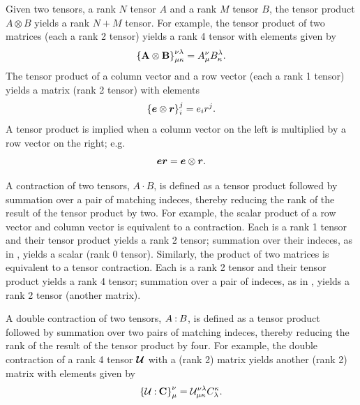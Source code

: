 Given two tensors, a rank $N$ tensor $A$ and a rank $M$ tensor $B$, the tensor product $A \otimes B$ yields a rank $N+M$ tensor.  
%
For example, the tensor product of two matrices (each a rank 2 tensor) yields a rank 4 tensor with elements given by
%
\begin{equation}
\label{eqn:matrix_tensor_product}
	\left\{ {\bf A} \otimes {\bf B} \right\}_{\mu\kappa}^{\nu\lambda} = A_\mu^\nu B_\kappa^\lambda.
\end{equation}
%
The tensor product of a column vector and a row vector (each a rank 1 tensor) yields a matrix (rank 2 tensor)
with elements 
\begin{equation}
	\left\{ \mbox{\boldmath $e$} \otimes \mbox{\boldmath $r$}\right\}_i^j = e_i r^j.
	\label{eqn:tensor_product}
\end{equation}
%
A tensor product is implied when a column vector on the left
is multiplied by a row vector on the right; e.g.
%
\begin{equation}
	\mbox{\boldmath $e$} \mbox{\boldmath $r$} = \mbox{\boldmath $e$} \otimes \mbox{\boldmath $r$}.
	\label{eqn:implicit_tensor_product}
\end{equation}
%

%
A contraction of two tensors, $A\cdot B$, is defined as a tensor product followed by summation over a pair of matching indeces, thereby reducing the rank of the result of the tensor product by two.
%
For example, the scalar product of a row vector and column vector is equivalent to a contraction.  Each is a rank 1 tensor and their tensor product yields a rank 2 tensor; summation over their indeces, as in , yields a scalar (rank 0 tensor).
%
Similarly, the product of two matrices is equivalent to a tensor contraction.  Each is a rank 2 tensor and their tensor product yields a rank 4 tensor; summation over a pair of indeces, as in , yields a rank 2 tensor (another matrix).

A double contraction of two tensors, $A \mathbin{:} B$, is defined as a tensor product followed by summation over two pairs of matching indeces, thereby reducing the rank of the result of the tensor product by four.
%
For example, the double contraction of a rank 4 tensor $\mbox{\boldmath $\mathcal{U}$}$ with a (rank 2) matrix  yields another (rank 2) matrix with elements given by
%
\begin{equation}
	\left\{ \mathcal{U} \mathbin{:} {\bf C} \right\}_\mu^\nu = \mathcal{U}_{\mu\kappa}^{\nu\lambda} C_\lambda^\kappa.
	\label{eqn:double_contraction}
\end{equation}

